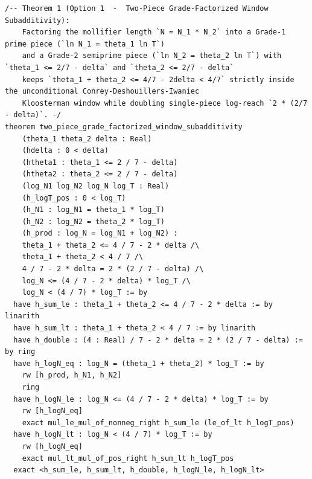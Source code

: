 \documentclass[11pt,a4paper]{article}
\begin{document}
\begin{lstlisting}[language=Lean4]
/-- Theorem 1 (Option 1  -  Two-Piece Grade-Factorized Window Subadditivity):
    Factoring the mollifier length `N = N_1 * N_2` into a Grade-1 prime piece (`ln N_1 = theta_1 ln T`)
    and a Grade-2 semiprime piece (`ln N_2 = theta_2 ln T`) with `theta_1 <= 2/7 - delta` and `theta_2 <= 2/7 - delta`
    keeps `theta_1 + theta_2 <= 4/7 - 2delta < 4/7` strictly inside the unconditional Conrey-Deshouillers-Iwaniec
    Kloosterman window while doubling single-piece log-reach `2 * (2/7 - delta)`. -/
theorem two_piece_grade_factorized_window_subadditivity
    (theta_1 theta_2 delta : Real)
    (hdelta : 0 < delta)
    (htheta1 : theta_1 <= 2 / 7 - delta)
    (htheta2 : theta_2 <= 2 / 7 - delta)
    (log_N1 log_N2 log_N log_T : Real)
    (h_logT_pos : 0 < log_T)
    (h_N1 : log_N1 = theta_1 * log_T)
    (h_N2 : log_N2 = theta_2 * log_T)
    (h_prod : log_N = log_N1 + log_N2) :
    theta_1 + theta_2 <= 4 / 7 - 2 * delta /\
    theta_1 + theta_2 < 4 / 7 /\
    4 / 7 - 2 * delta = 2 * (2 / 7 - delta) /\
    log_N <= (4 / 7 - 2 * delta) * log_T /\
    log_N < (4 / 7) * log_T := by
  have h_sum_le : theta_1 + theta_2 <= 4 / 7 - 2 * delta := by linarith
  have h_sum_lt : theta_1 + theta_2 < 4 / 7 := by linarith
  have h_double : (4 : Real) / 7 - 2 * delta = 2 * (2 / 7 - delta) := by ring
  have h_logN_eq : log_N = (theta_1 + theta_2) * log_T := by
    rw [h_prod, h_N1, h_N2]
    ring
  have h_logN_le : log_N <= (4 / 7 - 2 * delta) * log_T := by
    rw [h_logN_eq]
    exact mul_le_mul_of_nonneg_right h_sum_le (le_of_lt h_logT_pos)
  have h_logN_lt : log_N < (4 / 7) * log_T := by
    rw [h_logN_eq]
    exact mul_lt_mul_of_pos_right h_sum_lt h_logT_pos
  exact <h_sum_le, h_sum_lt, h_double, h_logN_le, h_logN_lt>


\end{lstlisting}
\end{document}
